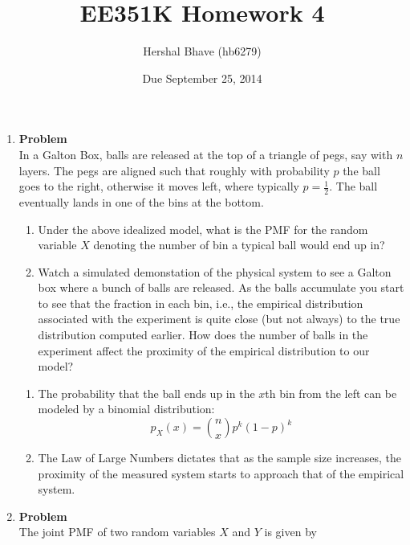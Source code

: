 \documentclass[12pt]{article}
\title{EE351K Homework 4}
\author{Hershal Bhave (hb6279)}
\date{Due September 25, 2014}
\newenvironment{Ex}{\textbf{Problem}\vspace{.75em}\\}{}
\begin{document}
\maketitle
\begin{enumerate}
\item
  \begin{Ex}
    In a Galton Box, balls are released at the top of a triangle of
    pegs, say with $n$ layers. The pegs are aligned such that roughly
    with probability $p$ the ball goes to the right, otherwise it
    moves left, where typically $p = \frac{1}{2}$. The ball eventually
    lands in one of the bins at the bottom.
    \begin{enumerate}
    \item Under the above idealized model, what is the PMF for the
      random variable $X$ denoting the number of bin a typical ball
      would end up in?
    \item Watch a simulated demonstation of the physical system to
      see a Galton box where a bunch of balls are released. As the
      balls accumulate you start to see that the fraction in each bin,
      i.e., the empirical distribution associated with the experiment
      is quite close (but not always) to the true distribution
      computed earlier. How does the number of balls in the experiment
      affect the proximity of the empirical distribution to our model?
    \end{enumerate}
    \begin{solution} \hfill
      \begin{enumerate}
      \item The probability that the ball ends up in the $x$th bin
        from the left can be modeled by a binomial distribution:
        \begin{equation}
          \label{eq:1a-binomial-dist}
          p_X(x) = {n \choose x} p^k(1-p)^k
        \end{equation}
      \item The Law of Large Numbers dictates that as the sample size
        increases, the proximity of the measured system starts to
        approach that of the empirical system.
      \end{enumerate}
    \end{solution}
  \end{Ex}
\item
  \begin{Ex}
    The joint PMF of two random variables $X$ and $Y$ is given by
    \begin{equation*}

\end{equation*}
\end{Ex}
\end{enumerate}
\end{document}
